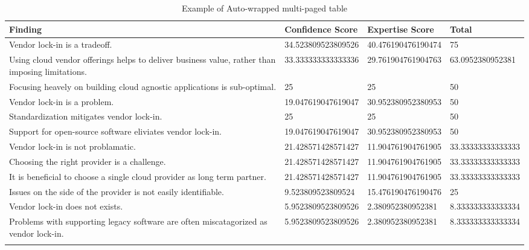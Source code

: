 
\renewcommand\arraystretch{1.5}%
\begin{longtable}{|p{10cm}|p{2cm}|p{2cm}|}
\hline
\textbf{Finding}  & \textbf{Confidence Score} & \textbf{Expertise Score} & \textbf{Total} \\ \hline
\endhead
Vendor lock-in is a tradeoff. & 34.523809523809526 & 40.476190476190474 & 75 \\ \hline
Using cloud vendor offerings helps to deliver business value, rather than imposing limitations. & 33.333333333333336 & 29.761904761904763 & 63.0952380952381 \\ \hline
Focusing heavely on building cloud agnostic applications is sub-optimal. & 25 & 25 & 50 \\ \hline
Vendor lock-in is a problem. & 19.047619047619047 & 30.952380952380953 & 50 \\ \hline
Standardization mitigates vendor lock-in. & 25 & 25 & 50 \\ \hline
Support for open-source software eliviates vendor lock-in. & 19.047619047619047 & 30.952380952380953 & 50 \\ \hline
Vendor lock-in is not problamatic. & 21.428571428571427 & 11.904761904761905 & 33.33333333333333 \\ \hline
Choosing the right provider is a challenge. & 21.428571428571427 & 11.904761904761905 & 33.33333333333333 \\ \hline
It is beneficial to choose a single cloud provider as long term partner. & 21.428571428571427 & 11.904761904761905 & 33.33333333333333 \\ \hline
Issues on the side of the provider is not easily identifiable. & 9.523809523809524 & 15.476190476190476 & 25 \\ \hline
Vendor lock-in does not exists. & 5.9523809523809526 & 2.380952380952381 & 8.333333333333334 \\ \hline
Problems with supporting legacy software are often miscatagorized as vendor lock-in. & 5.9523809523809526 & 2.380952380952381 & 8.333333333333334 \\ \hline
\caption{Example of Auto-wrapped multi-paged table}
\label{tab:table1}
\end{longtable}

